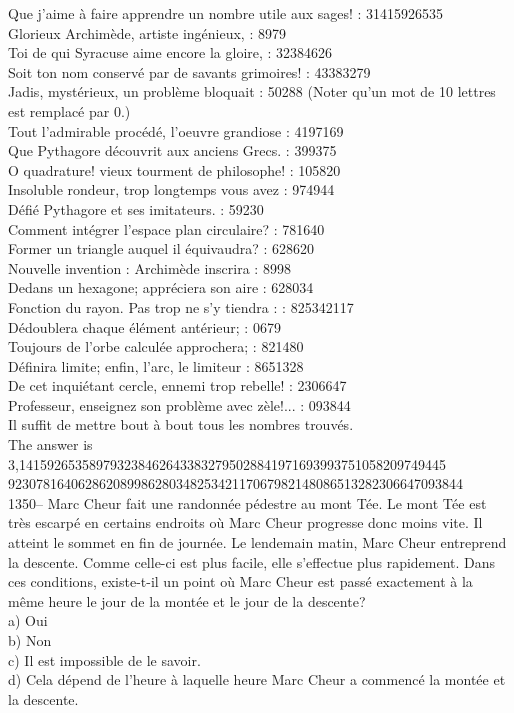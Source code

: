 \documentclass[letterpaper, 12pt]{article}
\begin{document}
Que j'aime \`a faire apprendre un nombre utile aux sages! : 31415926535\\
Glorieux Archim\`ede, artiste ing\'enieux, : 8979\\
Toi de qui Syracuse aime encore la gloire, : 32384626\\
Soit ton nom conserv\'e par de savants grimoires! : 43383279\\
Jadis, myst\'erieux, un probl\`eme bloquait : 50288  (Noter qu'un mot de 10
lettres est remplac\'e par 0.)\\
Tout l'admirable proc\'ed\'e, l'oeuvre grandiose : 4197169\\
Que Pythagore d\'ecouvrit aux anciens Grecs. : 399375\\
O quadrature! vieux tourment de philosophe! : 105820\\
Insoluble rondeur, trop longtemps vous avez : 974944\\
D\'efi\'e Pythagore et ses imitateurs. : 59230\\
Comment int\'egrer l'espace plan circulaire? : 781640\\
Former un triangle auquel il \'equivaudra? : 628620\\
Nouvelle invention : Archim\`ede inscrira : 8998\\
Dedans un hexagone; appr\'eciera son aire : 628034\\
Fonction du rayon. Pas trop ne s'y tiendra : : 825342117\\
D\'edoublera chaque \'el\'ement ant\'erieur; : 0679\\
Toujours de l'orbe calcul\'ee approchera; : 821480\\
D\'efinira limite; enfin, l'arc, le limiteur : 8651328\\
De cet inqui\'etant cercle, ennemi trop rebelle! : 2306647\\
Professeur, enseignez son probl\`eme avec z\`ele!... : 093844\\

Il suffit de mettre bout \`a bout tous les nombres trouv\'es.\\

The answer is\\
3,1415926535897932384626433832795028841971693993751058209749445\\
92307816406286208998628034825342117067982148086513282306647093844\\

1350-- Marc Cheur fait une randonn\'ee p\'edestre au mont T\'ee.  Le mont
T\'ee est tr\`es escarp\'e en certains endroits o\`u Marc Cheur progresse
donc moins vite.  Il atteint le sommet en fin de journ\'ee.  Le lendemain
matin, Marc Cheur entreprend la descente.  Comme celle-ci est plus facile,
elle s'effectue plus rapidement.  Dans ces conditions, existe-t-il un point
o\`u Marc Cheur est pass\'e exactement \`a la m\^eme heure le jour de la
mont\'ee et le jour de la descente?\\
a) Oui\\
b) Non\\
c) Il est impossible de le savoir.\\
d) Cela d\'epend de l'heure \`a laquelle heure Marc Cheur a commenc\'e la
mont\'ee et la descente.\\
\end{document}
